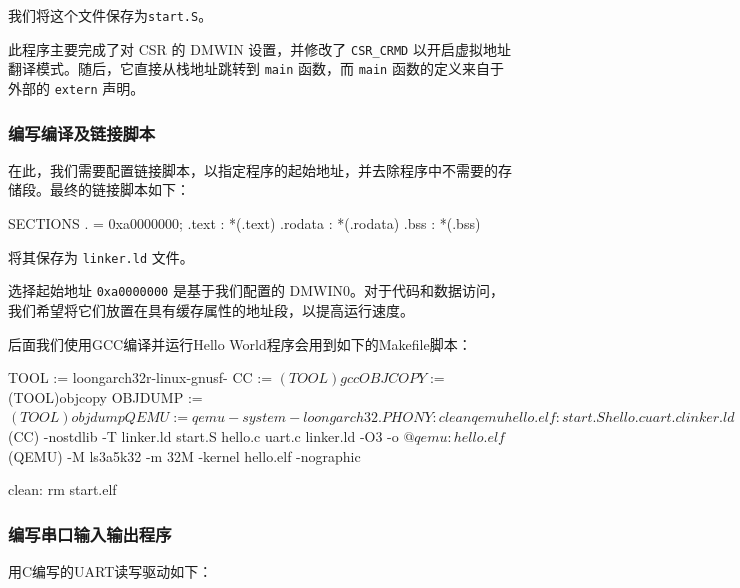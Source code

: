我们将这个文件保存为\texttt{start.S}。

此程序主要完成了对 CSR 的 DMWIN 设置，并修改了 \texttt{CSR\_CRMD} 以开启虚拟地址翻译模式。随后，它直接从栈地址跳转到 \texttt{main} 函数，而 \texttt{main} 函数的定义来自于外部的 \texttt{extern} 声明。

\subsubsection{编写编译及链接脚本}\label{sec:02-software-preparation-012}

在此，我们需要配置链接脚本，以指定程序的起始地址，并去除程序中不需要的存储段。最终的链接脚本如下：

\begin{CodeBlock}[language=BookLinker]
SECTIONS
{
    . = 0xa0000000;
    .text : { *(.text) }
    .rodata : { *(.rodata) }
    .bss : { *(.bss) }
}
\end{CodeBlock}

将其保存为 \texttt{linker.ld} 文件。

选择起始地址 \texttt{0xa0000000} 是基于我们配置的 DMWIN0。对于代码和数据访问，我们希望将它们放置在具有缓存属性的地址段，以提高运行速度。

后面我们使用GCC编译并运行Hello World程序会用到如下的Makefile脚本：

\begin{CodeBlock}[language=BookMake]
TOOL    :=  loongarch32r-linux-gnusf-
CC      :=  $(TOOL)gcc
OBJCOPY :=  $(TOOL)objcopy
OBJDUMP :=  $(TOOL)objdump
QEMU    :=  qemu-system-loongarch32

.PHONY: clean qemu

hello.elf: start.S hello.c uart.c linker.ld
    $(CC) -nostdlib -T linker.ld start.S hello.c uart.c linker.ld -O3 -o $@

qemu: hello.elf
    $(QEMU) -M ls3a5k32 -m 32M -kernel hello.elf -nographic

clean:
    rm start.elf
\end{CodeBlock}

\subsubsection{编写串口输入输出程序}\label{sec:02-software-preparation-013}

用C编写的UART读写驱动如下：

